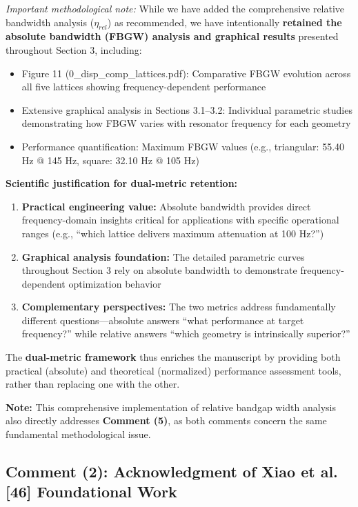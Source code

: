 \documentclass[11pt,a4paper]{article}
\newenvironment{changesbox}{%
    \par\medskip\noindent{\color{changescolor}\rule{\linewidth}{2pt}}\par
    \noindent{\color{changescolor}\bfseries Manuscript Changes}\par\smallskip
}{%
    \par\noindent{\color{changescolor}\rule{\linewidth}{0.5pt}}\medskip
}
\begin{document}
\begin{changesbox}
\textit{Important methodological note:} While we have added the comprehensive relative bandwidth analysis ($\eta_{rel}$) as recommended, we have intentionally \textbf{retained the absolute bandwidth (FBGW) analysis and graphical results} presented throughout Section 3, including:
\begin{itemize}
    \item Figure 11 (0\_disp\_comp\_lattices.pdf): Comparative FBGW evolution across all five lattices showing frequency-dependent performance
    \item Extensive graphical analysis in Sections 3.1--3.2: Individual parametric studies demonstrating how FBGW varies with resonator frequency for each geometry
    \item Performance quantification: Maximum FBGW values (e.g., triangular: 55.40 Hz @ 145 Hz, square: 32.10 Hz @ 105 Hz)
\end{itemize}

\textbf{Scientific justification for dual-metric retention:}
\begin{enumerate}
    \item \textbf{Practical engineering value:} Absolute bandwidth provides direct frequency-domain insights critical for applications with specific operational ranges (e.g., ``which lattice delivers maximum attenuation at 100 Hz?'')
    \item \textbf{Graphical analysis foundation:} The detailed parametric curves throughout Section 3 rely on absolute bandwidth to demonstrate frequency-dependent optimization behavior
    \item \textbf{Complementary perspectives:} The two metrics address fundamentally different questions---absolute answers ``what performance at target frequency?'' while relative answers ``which geometry is intrinsically superior?''
\end{enumerate}

The \textbf{dual-metric framework} thus enriches the manuscript by providing both practical (absolute) and theoretical (normalized) performance assessment tools, rather than replacing one with the other.
\end{changesbox}

\textbf{Note:} This comprehensive implementation of relative bandgap width analysis also directly addresses \textbf{Comment (5)}, as both comments concern the same fundamental methodological issue.

\newpage

\subsection*{Comment (2): Acknowledgment of Xiao et al. [46] Foundational Work}
\end{document}
